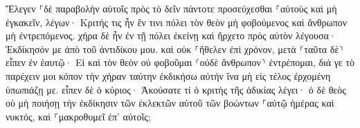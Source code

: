 \documentclass{openreader}
\begin{document}
Ἔλεγεν ⸀δὲ παραβολὴν αὐτοῖς πρὸς τὸ δεῖν πάντοτε προσεύχεσθαι ⸀αὐτοὺς καὶ μὴ ἐγκακεῖν, 
λέγων· Κριτής τις ἦν ἔν τινι πόλει τὸν θεὸν μὴ φοβούμενος καὶ ἄνθρωπον μὴ ἐντρεπόμενος. 
χήρα δὲ ἦν ἐν τῇ πόλει ἐκείνῃ καὶ ἤρχετο πρὸς αὐτὸν λέγουσα· Ἐκδίκησόν με ἀπὸ τοῦ ἀντιδίκου μου. 
καὶ οὐκ ⸀ἤθελεν ἐπὶ χρόνον, μετὰ ⸂ταῦτα δὲ⸃ εἶπεν ἐν ἑαυτῷ· Εἰ καὶ τὸν θεὸν οὐ φοβοῦμαι ⸂οὐδὲ ἄνθρωπον⸃ ἐντρέπομαι, 
διά γε τὸ παρέχειν μοι κόπον τὴν χήραν ταύτην ἐκδικήσω αὐτήν ἵνα μὴ εἰς τέλος ἐρχομένη ὑπωπιάζῃ με. 
εἶπεν δὲ ὁ κύριος· Ἀκούσατε τί ὁ κριτὴς τῆς ἀδικίας λέγει· 
ὁ δὲ θεὸς οὐ μὴ ποιήσῃ τὴν ἐκδίκησιν τῶν ἐκλεκτῶν αὐτοῦ τῶν βοώντων ⸀αὐτῷ ἡμέρας καὶ νυκτός, καὶ ⸀μακροθυμεῖ ἐπ’ αὐτοῖς; 
\end{document}
